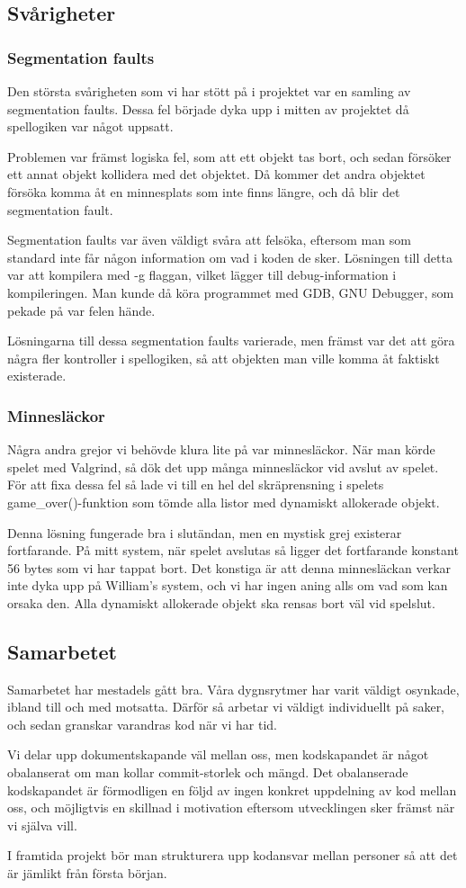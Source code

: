 \documentclass{TDP005mall}
\begin{document}
\subsection{Svårigheter}
\subsubsection{Segmentation faults}
Den största svårigheten som vi har stött på i projektet var en samling av segmentation faults. Dessa fel började dyka upp i mitten av projektet då spellogiken var något uppsatt.

Problemen var främst logiska fel, som att ett objekt tas bort, och sedan försöker ett annat objekt kollidera med det objektet. Då kommer det andra objektet försöka komma åt en minnesplats som inte finns längre, och då blir det segmentation fault.

Segmentation faults var även väldigt svåra att felsöka, eftersom man som standard inte får någon information om vad i koden de sker. Lösningen till detta var att kompilera med -g flaggan, vilket lägger till debug-information i kompileringen. Man kunde då köra programmet med GDB, GNU Debugger, som pekade på var felen hände.

Lösningarna till dessa segmentation faults varierade, men främst var det att göra några fler kontroller i spellogiken, så att objekten man ville komma åt faktiskt existerade.

\subsubsection{Minnesläckor}
Några andra grejor vi behövde klura lite på var minnesläckor. När man körde spelet med Valgrind, så dök det upp många minnesläckor vid avslut av spelet.
För att fixa dessa fel så lade vi till en hel del skräprensning i spelets game\_over()-funktion som tömde alla listor med dynamiskt allokerade objekt.

Denna lösning fungerade bra i slutändan, men en mystisk grej existerar fortfarande. På mitt system, när spelet avslutas så ligger det fortfarande konstant 56 bytes som vi har tappat bort. Det konstiga är att denna minnesläckan verkar inte dyka upp på William's system, och vi har ingen aning alls om vad som kan orsaka den. Alla dynamiskt allokerade objekt ska rensas bort väl vid spelslut.

\subsection{Samarbetet}
Samarbetet har mestadels gått bra. Våra dygnsrytmer har varit väldigt osynkade, ibland till och med motsatta. Därför så arbetar vi väldigt individuellt på saker, och sedan granskar varandras kod när vi har tid.

Vi delar upp dokumentskapande väl mellan oss, men kodskapandet är något obalanserat om man kollar commit-storlek och mängd. Det obalanserade kodskapandet är förmodligen en följd av ingen konkret uppdelning av kod mellan oss, och möjligtvis en skillnad i motivation eftersom utvecklingen sker främst när vi själva vill.

I framtida projekt bör man strukturera upp kodansvar mellan personer så att det är jämlikt från första början.
\end{document}
